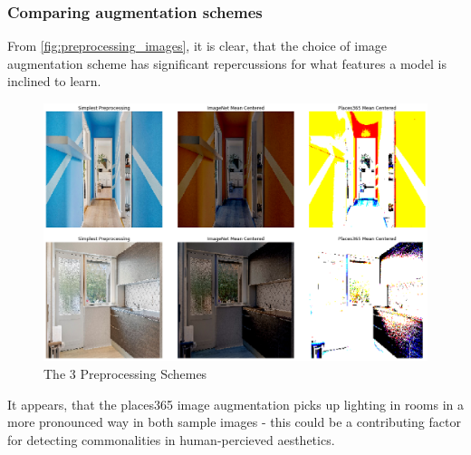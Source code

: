 \subsubsection{Comparing augmentation schemes}
From \autoref{fig:preprocessing_images}, it is clear, that the choice of image augmentation scheme has significant repercussions for what features a model is inclined to learn. 

\begin{figure}[H]
    \centering
    \includegraphics[scale=0.3]{pictures/plots/image2_preprocessing}
    \caption{The 3 Preprocessing Schemes}
    \label{fig:preprocessing_images}
\end{figure}

It appears, that the places365 image augmentation picks up lighting in rooms in a more pronounced way in both sample images - this could be a contributing factor for detecting commonalities in human-percieved aesthetics. 